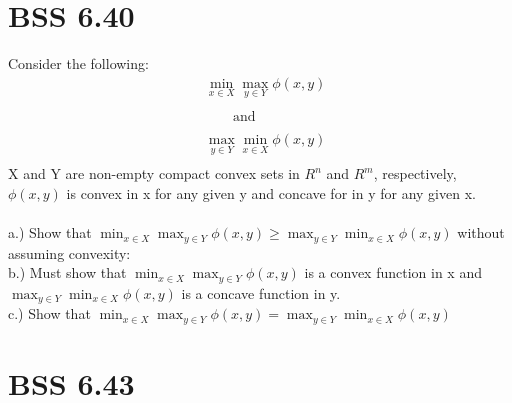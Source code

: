 \documentclass[12pt]{article}
\begin{document}
\section{BSS 6.40}
    Consider the following: \\
        \begin{align*}
            &\min_{x \in X} \max_{y \in Y} \phi(x,y)\\\\
            &\quad \quad \text{and}\\\\
            &\max_{y \in Y} \min_{x \in X} \phi(x,y)\\
        \end{align*}
    X and Y are non-empty compact convex sets in $R^n$ and $R^m$, respectively, $\phi (x,y)$ is convex in x for any given y and concave for in y for any given x.\\\\
    a.) Show that $\min_{x \in X} \max_{y \in Y} \phi(x,y) \geq \max_{y \in Y} \min_{x \in X} \phi(x,y)$ without assuming convexity:\\
    b.) Must show that $\min_{x \in X} \max_{y \in Y} \phi(x,y)$ is a convex function in x and $\max_{y \in Y} \min_{x \in X} \phi(x,y)$ is a concave function in y.\\
    c.) Show that $\min_{x \in X} \max_{y \in Y} \phi(x,y) = \max_{y \in Y} \min_{x \in X} \phi(x,y)$\\
\section{BSS 6.43}
\end{document}
